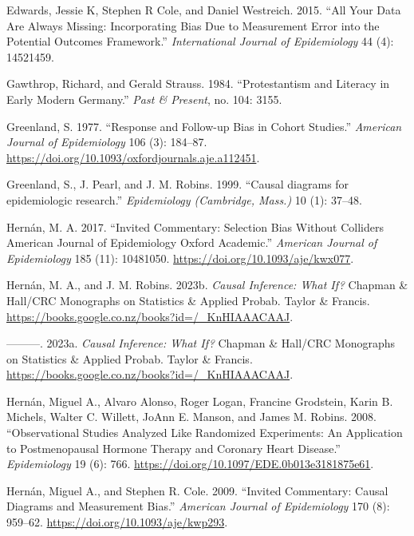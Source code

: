 \documentclass[
  singlecolumn]{article}
\newlength{\cslhangindent}
\newlength{\cslentryspacingunit} %
\newenvironment{CSLReferences}[2] %
 {%
  \setlength{\parindent}{0pt}
  \ifodd #1
  \let\oldpar\par
  \def\par{\hangindent=\cslhangindent\oldpar}
  \fi
  \setlength{\parskip}{#2\cslentryspacingunit}
 }%
 {}
\begin{document}
\begin{CSLReferences}{1}{0}
\leavevmode{}%
Edwards, Jessie K, Stephen R Cole, and Daniel Westreich. 2015. {``All
Your Data Are Always Missing: Incorporating Bias Due to Measurement
Error into the Potential Outcomes Framework.''} \emph{International
Journal of Epidemiology} 44 (4): 14521459.

\leavevmode{}%
Gawthrop, Richard, and Gerald Strauss. 1984. {``Protestantism and
Literacy in Early Modern Germany.''} \emph{Past \& Present}, no. 104:
3155.

\leavevmode{}%
Greenland, S. 1977. {``Response and Follow-up Bias in Cohort Studies.''}
\emph{American Journal of Epidemiology} 106 (3): 184--87.
\url{https://doi.org/10.1093/oxfordjournals.aje.a112451}.

\leavevmode{}%
Greenland, S., J. Pearl, and J. M. Robins. 1999. {``Causal diagrams for
epidemiologic research.''} \emph{Epidemiology (Cambridge, Mass.)} 10
(1): 37--48.

\leavevmode{}%
Hernán, M. A. 2017. {``Invited Commentary: Selection Bias Without
Colliders \textbar{} American Journal of Epidemiology \textbar{} Oxford
Academic.''} \emph{American Journal of Epidemiology} 185 (11): 10481050.
\url{https://doi.org/10.1093/aje/kwx077}.

\leavevmode{}%
Hernán, M. A., and J. M. Robins. 2023b. \emph{Causal Inference: What
If?} Chapman \& Hall/CRC Monographs on Statistics \& Applied Probab.
Taylor \& Francis.
\url{https://books.google.co.nz/books?id=/_KnHIAAACAAJ}.

\leavevmode{}%
---------. 2023a. \emph{Causal Inference: What If?} Chapman \& Hall/CRC
Monographs on Statistics \& Applied Probab. Taylor \& Francis.
\url{https://books.google.co.nz/books?id=/_KnHIAAACAAJ}.

\leavevmode{}%
Hernán, Miguel A., Alvaro Alonso, Roger Logan, Francine Grodstein, Karin
B. Michels, Walter C. Willett, JoAnn E. Manson, and James M. Robins.
2008. {``Observational Studies Analyzed Like Randomized Experiments: An
Application to Postmenopausal Hormone Therapy and Coronary Heart
Disease.''} \emph{Epidemiology} 19 (6): 766.
\url{https://doi.org/10.1097/EDE.0b013e3181875e61}.

\leavevmode{}%
Hernán, Miguel A., and Stephen R. Cole. 2009. {``Invited Commentary:
Causal Diagrams and Measurement Bias.''} \emph{American Journal of
Epidemiology} 170 (8): 959--62.
\url{https://doi.org/10.1093/aje/kwp293}.


\end{CSLReferences}
\end{document}
